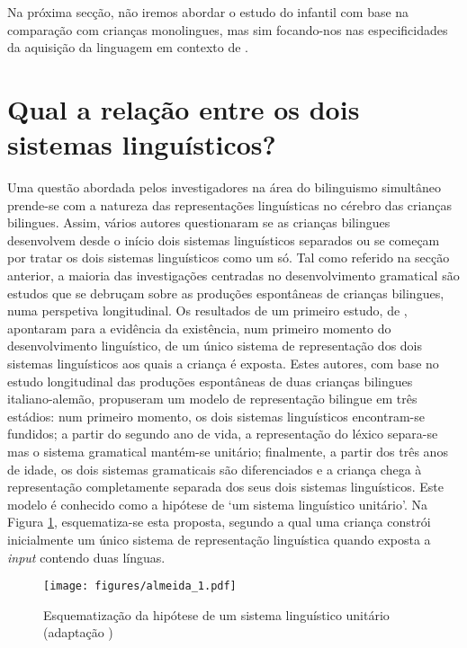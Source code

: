 \documentclass[output=paper]{LSP/langsci}
\begin{document}
Na próxima secção, não iremos abordar o estudo do  infantil com base na comparação com crianças monolingues, mas sim focando-nos nas especificidades da aquisição da linguagem em contexto de . 

\section{Qual a relação entre os dois sistemas linguísticos?}%
\label{sec:almeida_relacao}

Uma questão abordada pelos investigadores na área do bilinguismo simultâneo prende-se com a natureza das representações linguísticas no cérebro das crianças bilingues. Assim, vários autores questionaram se as crianças bilingues desenvolvem desde o início dois sistemas linguísticos separados ou se começam por tratar os dois sistemas linguísticos como um só. Tal como referido na secção anterior, a maioria das investigações centradas no desenvolvimento gramatical são estudos que se debruçam sobre as produções espontâneas de crianças bilingues, numa perspetiva longitudinal. Os resultados de um primeiro estudo, de \citet{volterrataeschner1978}, apontaram para a evidência da existência, num primeiro momento do desenvolvimento linguístico, de um único sistema de representação dos dois sistemas linguísticos aos quais a criança é exposta. Estes autores, com base no estudo longitudinal das produções espontâneas de duas crianças bilingues italiano-alemão, propuseram um modelo de representação bilingue em três estádios: num primeiro momento, os dois sistemas linguísticos encontram-se fundidos; a partir do segundo ano de vida, a representação do léxico separa-se mas o sistema gramatical mantém-se unitário; finalmente, a partir dos três anos de idade, os dois sistemas gramaticais são diferenciados e a criança chega à representação completamente separada dos seus dois sistemas linguísticos. Este modelo é conhecido como a hipótese de `um sistema linguístico unitário'. Na Figura \ref{fig:almeida_1}, esquematiza-se esta proposta, segundo a qual uma criança constrói inicialmente um único sistema de representação linguística quando exposta a \textit{input} contendo duas línguas. 

\begin{figure}
\texttt{[image: figures/almeida\_1.pdf]}
\caption{Esquematização da hipótese de um sistema linguístico unitário (adaptação \citealt{genesee_etal2004})}
\label{fig:almeida_1}
\end{figure}
\end{document}
